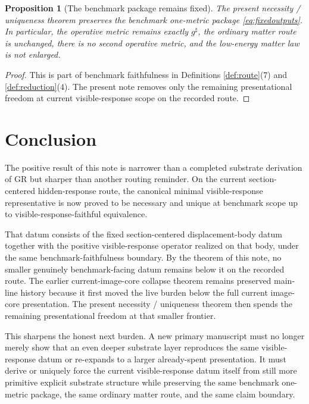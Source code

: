 \documentclass[11pt]{article}
\newcommand{\CompletedMetric}{g^{\sharp}}
\newtheorem{proposition}{Proposition}
\begin{document}
\begin{proposition}[The benchmark package remains fixed]
\label{prop:benchmark}
The present necessity / uniqueness theorem preserves the benchmark one-metric package \eqref{eq:fixedoutputs}. In particular, the operative metric remains exactly \(\CompletedMetric\), the ordinary matter route is unchanged, there is no second operative metric, and the low-energy matter law is not enlarged.
\end{proposition}

\begin{proof}
This is part of benchmark faithfulness in Definitions \ref{def:route}(7) and \ref{def:reduction}(4). The present note removes only the remaining presentational freedom at current visible-response scope on the recorded route.
\end{proof}

\section{Conclusion}

The positive result of this note is narrower than a completed substrate derivation of GR but sharper than another routing reminder. On the current section-centered hidden-response route, the canonical minimal visible-response representative is now proved to be necessary and unique at benchmark scope up to visible-response-faithful equivalence.

That datum consists of the fixed section-centered displacement-body datum together with the positive visible-response operator realized on that body, under the same benchmark-faithfulness boundary. By the theorem of this note, no smaller genuinely benchmark-facing datum remains below it on the recorded route. The earlier current-image-core collapse theorem remains preserved main-line history because it first moved the live burden below the full current image-core presentation. The present necessity / uniqueness theorem then spends the remaining presentational freedom at that smaller frontier.

This sharpens the honest next burden. A new primary manuscript must no longer merely show that an even deeper substrate layer reproduces the same visible-response datum or re-expands to a larger already-spent presentation. It must derive or uniquely force the current visible-response datum itself from still more primitive explicit substrate structure while preserving the same benchmark one-metric package, the same ordinary matter route, and the same claim boundary.
\end{document}
